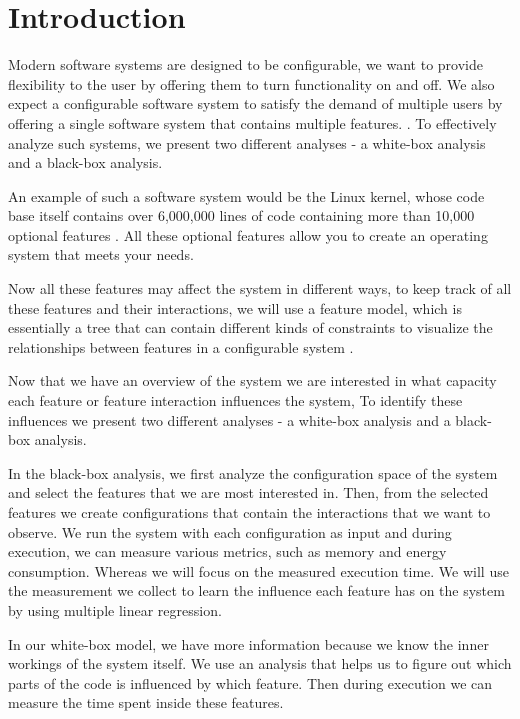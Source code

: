 \chapter{Introduction}\label{ch:introduction}

Modern software systems are designed to be configurable, we want to provide flexibility to the user by offering them to turn functionality on 
and off. 
We also expect a configurable software system to satisfy the demand of multiple users by offering a single software system that 
contains multiple features. \cite{Feature-Oriented-Software-Product-Lines}. 
To effectively analyze such systems,
we present two different analyses - a white-box analysis and a black-box analysis.


An example of such a software system would be the Linux kernel, whose code base itself contains over 6,000,000 lines of code containing more 
than 10,000 optional features \cite{Linux-Kernel}. 
All these optional features allow you to create an operating system that meets your needs. 

Now all these features may affect the system in different ways, to keep track of all these features and their interactions,
we will use a feature model, which is essentially a tree that can contain different kinds of constraints to visualize the relationships 
between features in a configurable system \cite{Feature-Oriented-Software-Product-Lines}. 

Now that we have an overview of the system we are interested in what capacity each feature or feature interaction influences the system,
To identify these influences we present two different analyses - a white-box analysis and a black-box analysis.

In the black-box analysis, we first analyze the configuration space of the system and select the features that we are most 
interested in. Then, from the selected features we create configurations that contain the interactions that we want to observe.
We run the system with each configuration as input and during execution, we can measure various metrics, such as memory and energy
consumption. Whereas we will focus on the measured execution time. We will use the measurement we collect to learn the influence
each feature has on the system by using multiple linear regression.

In our white-box model, we have more information because we know the inner workings of the system itself. We use an analysis 
that helps us to figure out which parts of the code is influenced by which feature. Then during execution we can measure
the time spent inside these features.

